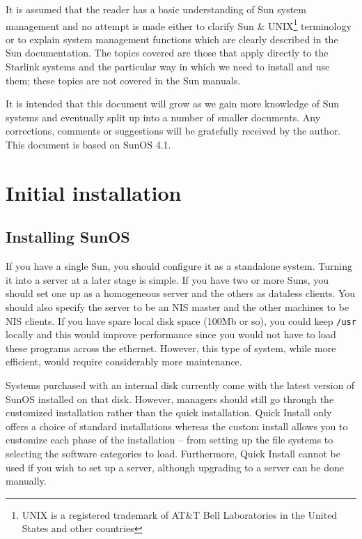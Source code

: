 It is assumed that the reader has a basic understanding of Sun system
management and no attempt is made either to clarify Sun \&
UNIX\footnote{UNIX is a registered trademark of AT\&T Bell Laboratories in the
United States and other countries} terminology
or to explain system management functions which are clearly described in
the Sun documentation. The topics covered are those that apply directly to
the Starlink systems and the particular way in which we need to install
and use them; these topics are not covered in the Sun manuals.

It is intended that this document will grow as we gain more knowledge
of Sun systems and eventually split up into a number of smaller documents.
Any corrections, comments or suggestions will be gratefully received by the
author. This document is based on SunOS 4.1.


\section{Initial installation}

\subsection{Installing SunOS}

If you have a single Sun, you should configure it as a standalone
system. Turning it into a server at a later stage is simple.
If you have two or more Suns, you should set one up as a homogeneous server
and the others as dataless clients. You should also specify the
server to be an NIS master and the other machines to be NIS clients.
If you have spare local disk space (100Mb or so), you could keep
{\tt /usr} locally and this would improve performance since you would
not have to load these programs across the ethernet. However, this
type of system, while more efficient, would require considerably more
maintenance.

Systems purchased with an internal disk currently come with the latest
version of SunOS installed on that disk. However, managers should still
go through the customized installation rather than the quick installation.
Quick Install only offers a choice of standard installations whereas
the custom install allows you to customize each phase of the installation --
from setting up the file systems to selecting the software categories to
load. Furthermore, Quick Install cannot be used if you wish to set up a
server, although upgrading to a server can be done manually.

